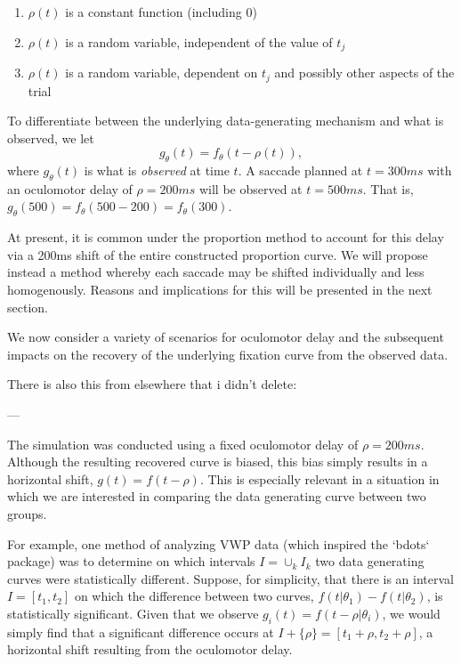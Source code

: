 \documentclass{article}
\begin{document}
\begin{enumerate}
\item $\rho(t)$ is a constant function (including 0)
\item $\rho(t)$ is a random variable, independent of the value of $t_j$
\item $\rho(t)$ is a random variable, dependent on $t_j$ and possibly other aspects of the trial
\end{enumerate}

To differentiate between the underlying data-generating mechanism and what is observed, we let
$$
g_{\theta}(t) = f_{\theta}(t - \rho(t)), 
$$
where $g_{\theta}(t)$ is what is \textit{observed} at time $t$. A saccade planned at $t = 300ms$ with an oculomotor delay of $\rho = 200ms$ will be observed at $t = 500ms$. That is, $g_{\theta}(500) = f_{\theta}(500 - 200) = f_{\theta}(300)$.

At present, it is common under the proportion method to account for this delay via a 200ms shift of the entire constructed proportion curve. We will propose instead a method whereby each saccade may be shifted individually and less homogenously. Reasons and implications for this will be presented in the next section.

We now consider a variety of scenarios for oculomotor delay and the subsequent impacts on the recovery of the underlying fixation curve from the observed data.

There is also this from elsewhere that i didn't delete:

---

The simulation was conducted using a fixed oculomotor delay of $\rho = 200ms$. Although the resulting recovered curve is biased, this bias simply results in a horizontal shift, $g(t) = f(t - \rho)$. This is especially relevant in a situation in which we are interested in comparing the data generating curve between two groups. 

For example, one method of analyzing VWP data (which inspired the `bdots` package) was to determine on which intervals $I = \cup_{k} I_k$ two data generating curves were statistically different. Suppose, for simplicity, that there is an interval $I = [t_1, t_2]$ on which the difference between two curves, $f(t | \theta_1) - f(t|\theta_2)$, is statistically significant. Given that we observe $g_i(t) = f(t - \rho | \theta_i)$, we would simply find that a significant difference occurs at $I + \{\rho\} = [t_1 + \rho, t_2 + \rho]$, a horizontal shift resulting from the oculomotor delay.
\end{document}
